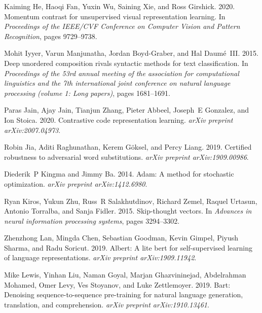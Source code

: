 \documentclass[11pt,a4paper]{article}
\begin{document}
\begin{thebibliography}{32}
Kaiming He, Haoqi Fan, Yuxin Wu, Saining Xie, and Ross Girshick. 2020.
\newblock Momentum contrast for unsupervised visual representation learning.
\newblock In \emph{Proceedings of the IEEE/CVF Conference on Computer Vision
  and Pattern Recognition}, pages 9729--9738.

Mohit Iyyer, Varun Manjunatha, Jordan Boyd-Graber, and Hal Daum{\'e}~III. 2015.
\newblock Deep unordered composition rivals syntactic methods for text
  classification.
\newblock In \emph{Proceedings of the 53rd annual meeting of the association
  for computational linguistics and the 7th international joint conference on
  natural language processing (volume 1: Long papers)}, pages 1681--1691.

Paras Jain, Ajay Jain, Tianjun Zhang, Pieter Abbeel, Joseph~E Gonzalez, and Ion
  Stoica. 2020.
\newblock Contrastive code representation learning.
\newblock \emph{arXiv preprint arXiv:2007.04973}.

Robin Jia, Aditi Raghunathan, Kerem G{\"o}ksel, and Percy Liang. 2019.
\newblock Certified robustness to adversarial word substitutions.
\newblock \emph{arXiv preprint arXiv:1909.00986}.

Diederik~P Kingma and Jimmy Ba. 2014.
\newblock Adam: A method for stochastic optimization.
\newblock \emph{arXiv preprint arXiv:1412.6980}.

Ryan Kiros, Yukun Zhu, Russ~R Salakhutdinov, Richard Zemel, Raquel Urtasun,
  Antonio Torralba, and Sanja Fidler. 2015.
\newblock Skip-thought vectors.
\newblock In \emph{Advances in neural information processing systems}, pages
  3294--3302.

Zhenzhong Lan, Mingda Chen, Sebastian Goodman, Kevin Gimpel, Piyush Sharma, and
  Radu Soricut. 2019.
\newblock Albert: A lite bert for self-supervised learning of language
  representations.
\newblock \emph{arXiv preprint arXiv:1909.11942}.

Mike Lewis, Yinhan Liu, Naman Goyal, Marjan Ghazvininejad, Abdelrahman Mohamed,
  Omer Levy, Ves Stoyanov, and Luke Zettlemoyer. 2019.
\newblock Bart: Denoising sequence-to-sequence pre-training for natural
  language generation, translation, and comprehension.
\newblock \emph{arXiv preprint arXiv:1910.13461}.


\end{thebibliography}
\end{document}
